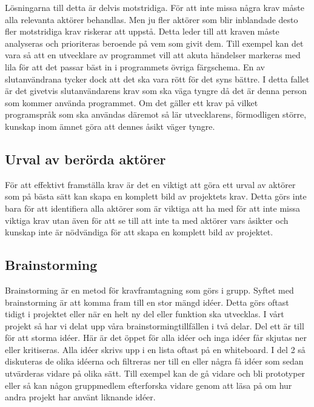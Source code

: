 Lösningarna till detta är delvis motstridiga. För att inte missa några krav måste alla relevanta aktörer behandlas. Men ju fler aktörer som blir inblandade desto fler motstridiga krav riskerar att uppstå. Detta leder till att kraven måste analyseras och prioriteras beroende på vem som givit dem.
Till exempel kan det vara så att en utvecklare av programmet vill att akuta händelser markeras med lila för att det passar bäst in i programmets övriga färgschema. En av slutanvändrana tycker dock att det ska vara rött för det syns bättre. I detta fallet är det givetvis slutanvändarens krav som ska väga tyngre då det är denna person som kommer använda programmet. 
Om det gäller ett krav på vilket programspråk som ska användas däremot så lär utvecklarens, förmodligen större, kunskap inom ämnet göra att dennes åsikt väger tyngre.

\subsection{Urval av berörda aktörer}
För att effektivt framställa krav är det en viktigt att göra ett urval av aktörer som på bästa sätt kan skapa en komplett bild av projektets krav\cite{cs_choose_right}. Detta görs inte bara för att identifiera alla aktörer som är viktiga att ha med för att inte missa viktiga krav utan även för att se till att inte ta med aktörer vars åsikter och kunskap inte är nödvändiga för att skapa en komplett bild av projektet.

\subsection{Brainstorming}
Brainstorming är en metod för kravframtagning som görs i grupp. Syftet med brainstorming är att komma fram till en stor mängd idéer. Detta görs oftast tidigt i projektet eller när en helt ny del eller funktion ska utvecklas. I vårt projekt så har vi delat upp våra brainstormingtillfällen i två delar. Del ett är till för att storma idéer. Här är det öppet för alla idéer och inga idéer får skjutas ner eller kritiseras. Alla idéer skrivs upp i en lista oftast på en whiteboard. I del 2 så diskuteras de olika idéerna och filtreras ner till en eller några få idéer som sedan utvärderas vidare på olika sätt. Till exempel kan de gå vidare och bli prototyper eller så kan någon gruppmedlem efterforska vidare genom att läsa på om hur andra projekt har använt liknande idéer. 

